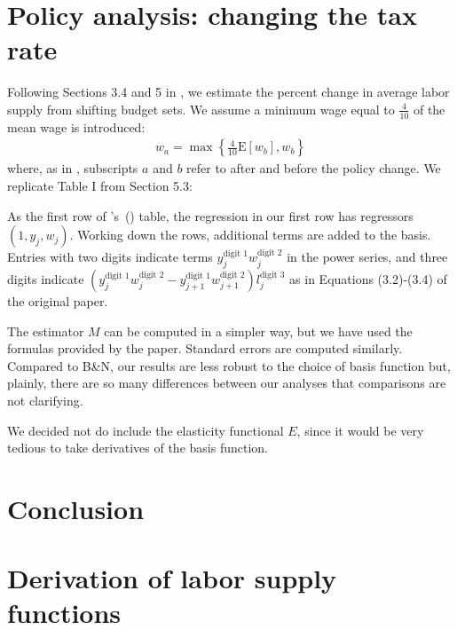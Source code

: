 \documentclass[11pt,letterpaper]{article}                  %
\newcommand\citepos[1]{\citeauthor{#1}'s\ (\citeyear{#1})}
\begin{document}
\section{Policy analysis: changing the tax rate}
\label{sec:policy}

Following Sections 3.4 and 5 in \citet{Blomquist2002}, we estimate the percent change in average labor supply from shifting budget sets.
We assume a minimum wage equal to $\tfrac{4}{10}$ of the mean wage is introduced:
\begin{align*}
  w_a = \max\left\{\tfrac{4}{10} \mathrm{E}[w_b], w_b\right\}
\end{align*}
where, as in \citet{Blomquist2002}, subscripts $a$ and $b$ refer to after and before the policy change.
We replicate Table I from Section 5.3:


As the first row of \citepos{Blomquist2002} table, the regression in our first row has regressors $(1,y_j,w_j)$.
Working down the rows, additional terms are added to the basis.
Entries with two digits indicate terms $y_j^{\text{digit }1}w_j^{\text{digit }2}$ in the power series, and three digits indicate $(y_{j}^{\text{digit }1}w_j^{\text{digit }2} -
y_{j+1}^{\text{digit }1}w_{j+1}^{\text{digit }2})l_j^{\text{digit }3}$ as in Equations (3.2)-(3.4) of the original paper.

The estimator $M$ can be computed in a simpler way, but we have used the formulas provided by the paper.
Standard errors are computed similarly.
Compared to B\&N, our results are less robust to the choice of basis function but, plainly, there are so many differences between our analyses that comparisons are not clarifying.

We decided not do include the elasticity functional $E$, since it would be very tedious to take derivatives of the basis function.

\section{Conclusion}
\label{sec:conclusion}







\appendix

\section{Derivation of labor supply functions}
\end{document}
